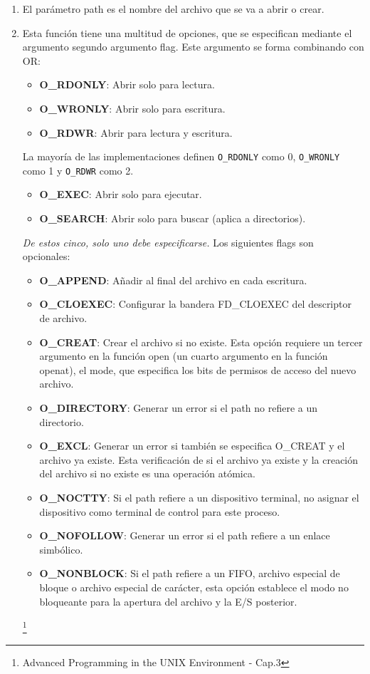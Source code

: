 \documentclass{article}
\begin{document}
\begin{enumerate}
    \item El parámetro path es el nombre del archivo que se va a abrir o crear. 
    \item Esta función tiene una multitud de opciones, que se especifican mediante el argumento segundo argumento flag. Este argumento se forma combinando con OR:
    \begin{itemize}
        \item \textbf{O\_RDONLY}: Abrir solo para lectura.
        \item \textbf{O\_WRONLY}: Abrir solo para escritura.
        \item \textbf{O\_RDWR}: Abrir para lectura y escritura.
    \end{itemize}
    La mayoría de las implementaciones definen \texttt{O\_RDONLY} como 0, \texttt{O\_WRONLY} como 1 y \texttt{O\_RDWR} como 2.
    \begin{itemize}
        \item \textbf{O\_EXEC}: Abrir solo para ejecutar.
        \item \textbf{O\_SEARCH}: Abrir solo para buscar (aplica a directorios).
    \end{itemize}
    \textit{De estos cinco, solo uno debe especificarse.} Los siguientes flags son opcionales:
    \begin{itemize}
        \item \textbf{O\_APPEND}: Añadir al final del archivo en cada escritura.
        \item \textbf{O\_CLOEXEC}: Configurar la bandera FD\_CLOEXEC del descriptor de archivo. 
        \item \textbf{O\_CREAT}: Crear el archivo si no existe. Esta opción requiere un tercer argumento en la función open (un cuarto argumento en la función openat), el mode, que especifica los bits de permisos de acceso del nuevo archivo.
        \item \textbf{O\_DIRECTORY}: Generar un error si el path no refiere a un directorio.
        \item \textbf{O\_EXCL}: Generar un error si también se especifica O\_CREAT y el archivo ya existe. Esta verificación de si el archivo ya existe y la creación del archivo si no existe es una operación atómica. 
        \item \textbf{O\_NOCTTY}: Si el path refiere a un dispositivo terminal, no asignar el dispositivo como terminal de control para este proceso.
        \item \textbf{O\_NOFOLLOW}: Generar un error si el path refiere a un enlace simbólico.
        \item \textbf{O\_NONBLOCK}: Si el path refiere a un FIFO, archivo especial de bloque o archivo especial de carácter, esta opción establece el modo no bloqueante para la apertura del archivo y la E/S posterior. 
    \end{itemize} \footnote{Advanced Programming in the UNIX Environment - Cap.3}
\end{enumerate}
\end{document}
